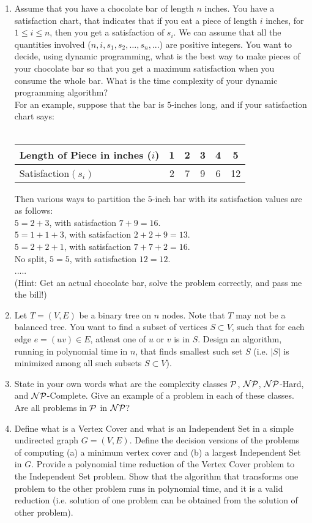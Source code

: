 \documentclass[12pt]{article}
\begin{document}
\begin{enumerate}
\item Assume that you have a chocolate bar of length $n$ inches. You have a satisfaction chart, that indicates that if you eat a piece of length $i$ inches, for $1\le i\le n$, then you get a satisfaction of $s_i$. We can assume that all the quantities involved ($n, i,s_1,s_2,\dots,s_n,...$) are  positive integers. You want to decide, using dynamic programming, what is the best way to make pieces of your chocolate bar so that you get a maximum satisfaction when you consume the whole bar. What is the time complexity of your dynamic programming algorithm?\\
For an example, suppose that the bar is $5$-inches long, and if your satisfaction chart says:\\ \\
\begin{tabular}{l|c|c|c|c|c}\hline
Length of Piece in inches ($i$) & 1& 2& 3&4&5\\ \hline
Satisfaction$(s_i)$  & 2&7&9&6&12\\ \hline
\end{tabular}  

\noindent Then  various ways to partition the $5$-inch bar with its satisfaction values are as follows:\\
$5=2+3$, with satisfaction $7+9=16$.\\
$5=1+1+3$, with satisfaction $2+2+9=13$.\\
$5=2+2+1$, with satisfaction $7+7+2=16$.\\
No split, $5=5$, with satisfaction $12=12$.\\
.....\\
\noindent (Hint: Get an actual chocolate bar, solve the problem correctly, and pass me the bill!)

\item Let $T=(V,E)$ be a binary tree on $n$ nodes. Note that $T$ may not be a balanced tree. You want to find a subset of vertices  $S\subset V$, such that for each edge $e=(uv)\in E$, atleast one of $u$ or $v$ is in $S$. Design an algorithm, running in polynomial time in $n$, that finds smallest such set $S$ (i.e. $|S|$ is minimized among all such subsets $S\subset V$).  

\item State in your own words what are the complexity classes $\cal P$, $\cal{NP}$, $\cal{NP}$-Hard, and $\cal{NP}$-Complete. Give an example of a problem in each of these classes. Are all problems in $\cal P$ in $\cal{NP}$?

\item Define what  is a Vertex Cover and what is an Independent Set in a simple undirected graph $G=(V,E)$. Define the decision versions of the problems of computing (a) a minimum vertex cover and (b) a largest Independent Set in $G$.
Provide a polynomial time reduction of the Vertex Cover problem to the Independent Set problem. Show that the algorithm that transforms one problem to the other problem runs in polynomial time, and it is a valid reduction (i.e. solution of one problem can be obtained from the solution of other problem).


\end{enumerate}
\end{document}
